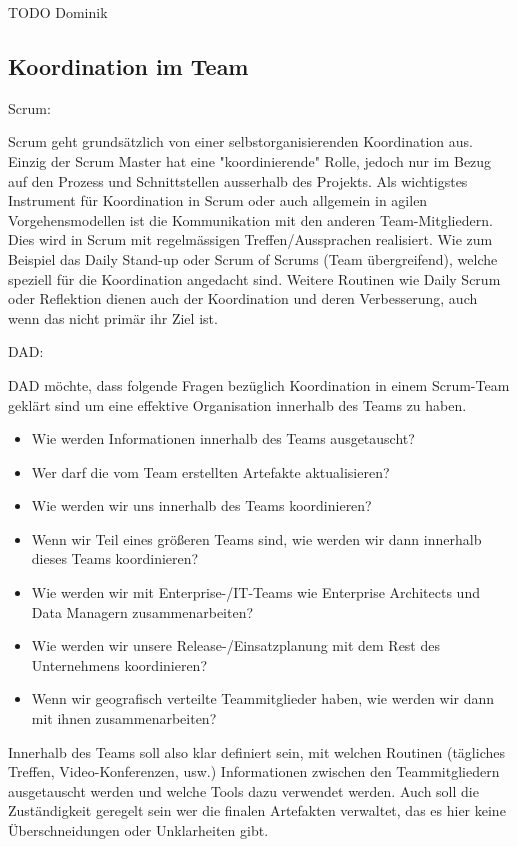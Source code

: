 TODO Dominik



\subsection{Koordination im Team}



{\Large Scrum:} \cite{planningReleaseScrum} \medskip

Scrum geht grundsätzlich von einer selbstorganisierenden Koordination aus. Einzig der Scrum Master hat eine "koordinierende" Rolle, jedoch nur im Bezug auf den Prozess und Schnittstellen ausserhalb des Projekts.
Als wichtigstes Instrument für Koordination in Scrum oder auch allgemein in agilen Vorgehensmodellen ist die Kommunikation mit den anderen Team-Mitgliedern. Dies wird in Scrum mit regelmässigen Treffen/Aussprachen realisiert. Wie zum Beispiel das Daily Stand-up oder Scrum of Scrums (Team übergreifend), welche speziell für die Koordination angedacht sind. Weitere Routinen wie Daily Scrum oder Reflektion dienen auch der Koordination und deren Verbesserung, auch wenn das nicht primär ihr Ziel ist.
\bigskip 

{\Large DAD:} \cite{planningReleaseDad} \medskip

DAD möchte, dass folgende Fragen bezüglich Koordination in einem Scrum-Team geklärt sind um eine effektive Organisation innerhalb des Teams zu haben.
\begin{itemize}
	\item 	Wie werden Informationen innerhalb des Teams ausgetauscht?
	\item 	Wer darf die vom Team erstellten Artefakte aktualisieren? 
	\item 	Wie werden wir uns innerhalb des Teams koordinieren?
	\item 	Wenn wir Teil eines größeren Teams sind, wie werden wir dann innerhalb dieses Teams koordinieren?
	\item 	Wie werden wir mit Enterprise-/IT-Teams wie Enterprise Architects und Data Managern zusammenarbeiten?
	\item 	Wie werden wir unsere Release-/Einsatzplanung mit dem Rest des Unternehmens koordinieren?
	\item 	Wenn wir geografisch verteilte Teammitglieder haben, wie werden wir dann mit ihnen zusammenarbeiten?
\end{itemize}
Innerhalb des Teams soll also klar definiert sein, mit welchen Routinen (tägliches Treffen, Video-Konferenzen, usw.) Informationen zwischen den Teammitgliedern ausgetauscht werden und welche Tools dazu verwendet werden. Auch soll die Zuständigkeit geregelt sein wer die finalen Artefakten verwaltet, das es hier keine Überschneidungen oder Unklarheiten gibt.
\medskip

